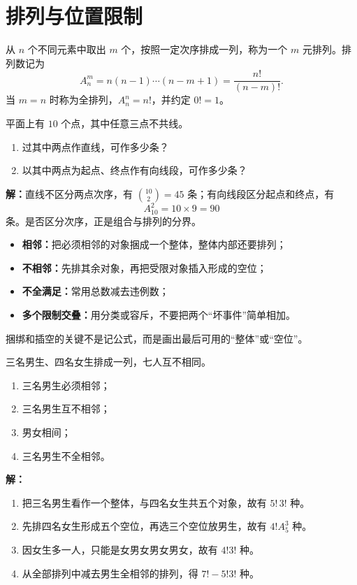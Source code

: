 \section{排列与位置限制}

\begin{definitionbox}[排列、排列数与全排列]
  从 $n$ 个不同元素中取出 $m$ 个，按照一定次序排成一列，称为一个 $m$ 元排列。排列数记为
  \[
    A_n^m=n(n-1)\cdots(n-m+1)=\frac{n!}{(n-m)!}.
  \]
  当 $m=n$ 时称为全排列，$A_n^n=n!$，并约定 $0!=1$。
\end{definitionbox}

\begin{examplebox}
  平面上有 $10$ 个点，其中任意三点不共线。
  \begin{enumerate}
    \item 过其中两点作直线，可作多少条？
    \item 以其中两点为起点、终点作有向线段，可作多少条？
  \end{enumerate}

  \textbf{解：}直线不区分两点次序，有 $\binom{10}{2}=45$ 条；有向线段区分起点和终点，有
  \[
    A_{10}^2=10\times9=90
  \]
  条。是否区分次序，正是组合与排列的分界。
\end{examplebox}

\begin{corollarybox}[四类位置限制]
  \begin{itemize}
    \item \textbf{相邻：}把必须相邻的对象捆成一个整体，整体内部还要排列；
    \item \textbf{不相邻：}先排其余对象，再把受限对象插入形成的空位；
    \item \textbf{不全满足：}常用总数减去违例数；
    \item \textbf{多个限制交叠：}用分类或容斥，不要把两个“坏事件”简单相加。
  \end{itemize}
  捆绑和插空的关键不是记公式，而是画出最后可用的“整体”或“空位”。
\end{corollarybox}

\begin{examplebox}
  三名男生、四名女生排成一列，七人互不相同。
  \begin{enumerate}
    \item 三名男生必须相邻；
    \item 三名男生互不相邻；
    \item 男女相间；
    \item 三名男生不全相邻。
  \end{enumerate}

  \textbf{解：}
  \begin{enumerate}
    \item 把三名男生看作一个整体，与四名女生共五个对象，故有 $5!\,3!$ 种。
    \item 先排四名女生形成五个空位，再选三个空位放男生，故有 $4!A_5^3$ 种。
    \item 因女生多一人，只能是女男女男女男女，故有 $4!3!$ 种。
    \item 从全部排列中减去男生全相邻的排列，得 $7!-5!3!$ 种。
  \end{enumerate}
\end{examplebox}

